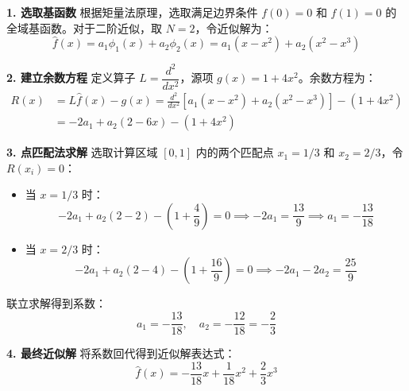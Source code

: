 \documentclass[11pt, a4paper]{article}
\begin{document}
\begin{tcolorbox}[colback=white, colframe=black, title=【解答】（第八章-Gemini作答）]
\textbf{1. 选取基函数}
根据矩量法原理，选取满足边界条件 $f(0)=0$ 和 $f(1)=0$ 的全域基函数。对于二阶近似，取 $N=2$，令近似解为：
\begin{equation*}
    \hat{f}(x) = a_1 \phi_1(x) + a_2 \phi_2(x) = a_1(x - x^2) + a_2(x^2 - x^3)
\end{equation*}

\textbf{2. 建立余数方程}
定义算子 $L = \dfrac{d^2}{dx^2}$，源项 $g(x) = 1 + 4x^2$。余数方程为：
\begin{align*}
    R(x) &= L\hat{f}(x) - g(x) = \frac{d^2}{dx^2} [a_1(x - x^2) + a_2(x^2 - x^3)] - (1 + 4x^2) \\
    &= -2a_1 + a_2(2 - 6x) - (1 + 4x^2)
\end{align*}

\textbf{3. 点匹配法求解}
选取计算区域 $[0, 1]$ 内的两个匹配点 $x_1 = 1/3$ 和 $x_2 = 2/3$，令 $R(x_i) = 0$：
\begin{itemize}
    \item 当 $x = 1/3$ 时：
    \begin{equation*}
        -2a_1 + a_2(2 - 2) - (1 + \frac{4}{9}) = 0 \implies -2a_1 = \frac{13}{9} \implies a_1 = -\frac{13}{18}
    \end{equation*}
    \item 当 $x = 2/3$ 时：
    \begin{equation*}
        -2a_1 + a_2(2 - 4) - (1 + \frac{16}{9}) = 0 \implies -2a_1 - 2a_2 = \frac{25}{9}
    \end{equation*}
\end{itemize}
联立求解得到系数：
\begin{equation*}
    a_1 = -\frac{13}{18}, \quad a_2 = -\frac{12}{18} = -\frac{2}{3}
\end{equation*}

\textbf{4. 最终近似解}
将系数回代得到近似解表达式：
\begin{equation*}
    \hat{f}(x) = -\frac{13}{18}x + \frac{1}{18}x^2 + \frac{2}{3}x^3
\end{equation*}
\end{tcolorbox}
\end{document}

